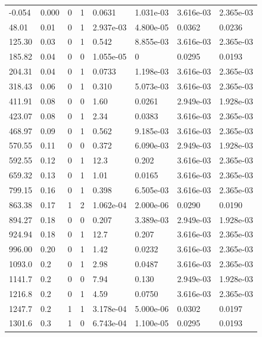 \documentclass[preview]{standalone}
\begin{document}
{{\begin{tabular}{L{1.2cm}C{1.2cm} C{0.3cm}C{0.5cm} C{1.4cm}C{1.4cm} C{1.4cm}C{1.4cm}}
  -0.054  &  0.000  & 0     &  1 &  0.0631  & 1.031e-03  & 3.616e-03 &  2.365e-03   \\ 
  48.01  &  0.01  & 0     &  1 &  2.937e-03  & 4.800e-05  & 0.0362 &  0.0236   \\ 
  125.30  &  0.03  & 0     &  1 &  0.542  & 8.855e-03  & 3.616e-03 &  2.365e-03   \\ 
  185.82  &  0.04  & 0     &  0 &  1.055e-05  & 0  & 0.0295 &  0.0193   \\ 
  204.31  &  0.04  & 0     &  1 &  0.0733  & 1.198e-03  & 3.616e-03 &  2.365e-03   \\ 
  318.43  &  0.06  & 0     &  1 &  0.310  & 5.073e-03  & 3.616e-03 &  2.365e-03   \\ 
  411.91  &  0.08  & 0     &  0 &  1.60  & 0.0261  & 2.949e-03 &  1.928e-03   \\ 
  423.07  &  0.08  & 0     &  1 &  2.34  & 0.0383  & 3.616e-03 &  2.365e-03   \\ 
  468.97  &  0.09  & 0     &  1 &  0.562  & 9.185e-03  & 3.616e-03 &  2.365e-03   \\ 
  570.55  &  0.11  & 0     &  0 &  0.372  & 6.090e-03  & 2.949e-03 &  1.928e-03   \\ 
  592.55  &  0.12  & 0     &  1 &  12.3  & 0.202  & 3.616e-03 &  2.365e-03   \\ 
  659.32  &  0.13  & 0     &  1 &  1.01  & 0.0165  & 3.616e-03 &  2.365e-03   \\ 
  799.15  &  0.16  & 0     &  1 &  0.398  & 6.505e-03  & 3.616e-03 &  2.365e-03   \\ 
  863.38  &  0.17  & 1     &  2 &  1.062e-04  & 2.000e-06  & 0.0290 &  0.0190   \\ 
  894.27  &  0.18  & 0     &  0 &  0.207  & 3.389e-03  & 2.949e-03 &  1.928e-03   \\ 
  924.94  &  0.18  & 0     &  1 &  12.7  & 0.207  & 3.616e-03 &  2.365e-03   \\ 
  996.00  &  0.20  & 0     &  1 &  1.42  & 0.0232  & 3.616e-03 &  2.365e-03   \\ 
  1093.0  &   0.2  & 0     &  1 &  2.98  & 0.0487  & 3.616e-03 &  2.365e-03   \\ 
  1141.7  &   0.2  & 0     &  0 &  7.94  & 0.130  & 2.949e-03 &  1.928e-03   \\ 
  1216.8  &   0.2  & 0     &  1 &  4.59  & 0.0750  & 3.616e-03 &  2.365e-03   \\ 
  1247.7  &   0.2  & 1     &  1 &  3.178e-04  & 5.000e-06  & 0.0302 &  0.0197   \\ 
  1301.6  &   0.3  & 1     &  0 &  6.743e-04  & 1.100e-05  & 0.0295 &  0.0193   \\ 

\end{tabular}}}
\end{document}
